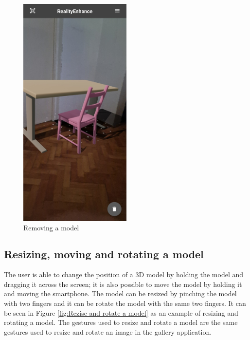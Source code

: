 \begin{figure}[ht]
    \begin{center}
        \includegraphics[width=0.5\textwidth]{img/App_screenshots/Multiple-models.jpg}
        \caption{Removing a model}
        \label{fig:multiple-models}
    \end{center}
\end{figure}
\pagebreak

\subsection{Resizing, moving and rotating a model}
The user is able to change the position of a \ac{3D} model by holding the model and dragging it across the screen; it is also possible to move the model by holding it and moving the smartphone.  The model can be resized by pinching the model with two fingers and it can be rotate the model with the same two fingers. It can be seen in Figure \ref{fig:Rezise and rotate a model} as an example of resizing and rotating a model. The gestures used to resize and rotate a model are the same gestures used to resize and rotate an image in the gallery application.

